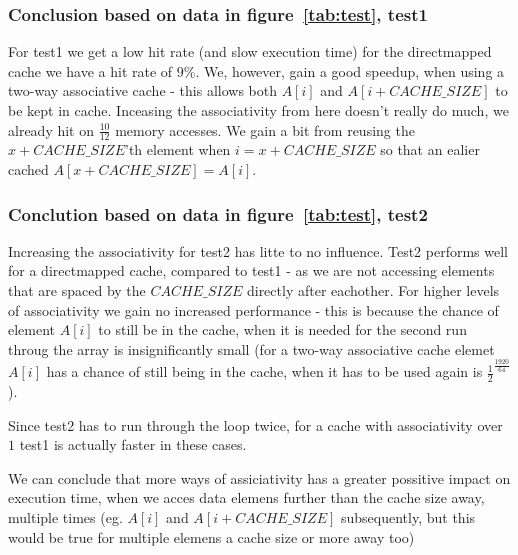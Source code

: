 \subsubsection{Conclusion based on data in figure~\ref{tab:test}, test1}
For test1 we get a low hit rate (and slow execution time) for the directmapped
cache we have a hit rate of $9\%$. We, however, gain a good speedup, when using
a two-way associative cache - this allows both $A[i]$ and $A[i + CACHE\_SIZE]$
to be kept in cache. Inceasing the associativity from here doesn't really do
much, we already hit on $\frac{10}{12}$ memory accesses. We gain a bit from
reusing the $x + CACHE\_SIZE$'th element when $i = x + CACHE\_SIZE$ so that an
ealier cached $A[x + CACHE\_SIZE] = A[i]$.

\subsubsection{Conclution based on data in figure~\ref{tab:test}, test2}
Increasing the associativity for test2 has litte to no influence. Test2 performs
well for a directmapped cache, compared to test1 - as we are not accessing
elements that are spaced by the $CACHE\_SIZE$ directly after eachother. For
higher levels of associativity we gain no increased performance - this is
because the chance of element $A[i]$ to still be in the cache, when it is needed
for the second run throug the array is insignificantly small (for a two-way
associative cache elemet $A[i]$ has a chance of still being in the cache, when
it has to be used again is $\frac{1}{2}^\frac{1920}{64}$).

Since test2 has to run through the loop twice, for a cache with associativity
over $1$ test1 is actually faster in these cases.

We can conclude that more ways of assiciativity has a greater possitive impact
on execution time, when we acces data elemens further than the cache size
away, multiple times (eg. $A[i]$ and $A[i + CACHE\_SIZE]$ subsequently, but
this would be true for multiple elemens a cache size or more away too)

